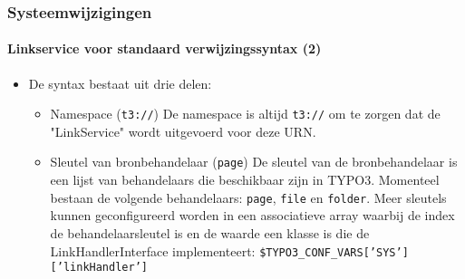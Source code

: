\begin{frame}[fragile]
	\frametitle{Systeemwijzigingen}
	\framesubtitle{Linkservice voor standaard verwijzingssyntax (2)}

	\begin{itemize}

		\item De syntax bestaat uit drie delen:

			\begin{itemize}

				\item Namespace (\texttt{t3://})\newline
		   			De namespace is altijd \texttt{t3://} om te zorgen dat de "LinkService" wordt uitgevoerd voor deze URN.
					\newline
				\item Sleutel van bronbehandelaar (\texttt{page})\newline
   					De sleutel van de bronbehandelaar is een lijst van behandelaars die beschikbaar zijn in TYPO3.
   					Momenteel bestaan de volgende behandelaars: \texttt{page}, \texttt{file} en \texttt{folder}.\newline
					Meer sleutels kunnen geconfigureerd worden in een associatieve array waarbij de index de behandelaarsleutel is
					en de waarde een klasse is die de LinkHandlerInterface implementeert:\newline
					\texttt{\$TYPO3\_CONF\_VARS['SYS']['linkHandler']}

			\end{itemize}

	\end{itemize}

\end{frame}

